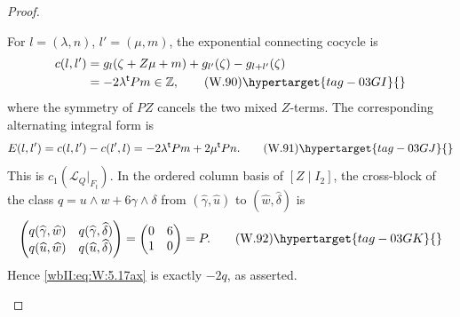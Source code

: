 \begin{proof}
\begin{enumerate}[label={$\langle1\rangle$\arabic*.},leftmargin=*]
For \(l=(\lambda,n)\), \(l'=(\mu,m)\), the exponential connecting
cocycle is
\begin{align*}
 c(l,l')
 &=g_l(\zeta+Z\mu+m)+g_{l'}(\zeta)-g_{l+l'}(\zeta)\\
 &=-2\lambda^{\mathsf t}Pm\in\mathbb Z,
\tag{W.90}\hypertarget{tag-03GI}{}\label{wbII:eq:W:5.17aw}
\end{align*}
where the symmetry of \(PZ\) cancels the two mixed \(Z\)-terms.
The corresponding alternating integral form is
\[
 E(l,l')=c(l,l')-c(l',l)
 =-2\lambda^{\mathsf t}Pm+2\mu^{\mathsf t}Pn.
\tag{W.91}\hypertarget{tag-03GJ}{}\label{wbII:eq:W:5.17ax}
\]
This is \(c_1(\mathcal L_Q|_{F_t})\).  In the ordered column basis of
\([Z\mid I_2]\), the cross-block of the class
\(q=u\wedge w+6\gamma\wedge\delta\) from
\((\widehat\gamma,\widehat u)\) to
\((\widehat w,\widehat\delta)\) is
\[
 \begin{pmatrix}
 q(\widehat\gamma,\widehat w)&
 q(\widehat\gamma,\widehat\delta)\\
 q(\widehat u,\widehat w)&
 q(\widehat u,\widehat\delta)
 \end{pmatrix}
 =\begin{pmatrix}0&6\\1&0\end{pmatrix}=P.
\tag{W.92}\hypertarget{tag-03GK}{}\label{wbII:eq:W:5.17ay}
\]
Hence \eqref{wbII:eq:W:5.17ax} is exactly \(-2q\), as asserted.

\end{enumerate}
\end{proof}
